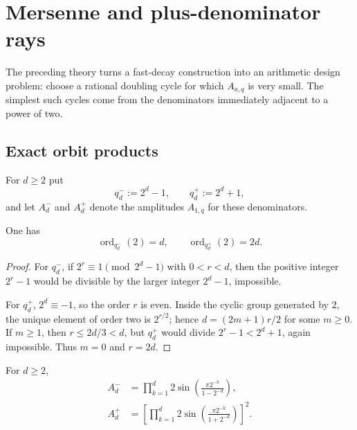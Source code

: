 \documentclass[11pt,oneside]{article}
\theoremstyle{definition}
\theoremstyle{remark}
\newcommand{\ord}{\operatorname{ord}}
\begin{document}
\section{Mersenne and plus-denominator rays}\label{p2:sec:mersenne}

The preceding theory turns a fast-decay construction into an arithmetic design
problem: choose a rational doubling cycle for which $A_{a,q}$ is very small. The
simplest such cycles come from the denominators immediately adjacent to a power of
two.

\subsection{Exact orbit products}

For $d\ge2$ put
\begin{equation}
 q_d^-:=2^d-1,
 \qquad q_d^+:=2^d+1,
 \label{p2:eq:qpm}
\end{equation}
and let $A_d^-$ and $A_d^+$ denote the amplitudes $A_{1,q}$ for these denominators.

\begin{lemma}\label{p2:lem:orders-pm}
One has
\begin{equation}
 \ord_{q_d^-}(2)=d,
 \qquad
 \ord_{q_d^+}(2)=2d.
 \label{p2:eq:orders-pm}
\end{equation}
\end{lemma}

\begin{proof}
For $q_d^-$, if $2^r\equiv1\pmod{2^d-1}$ with $0<r<d$, then the positive integer
$2^r-1$ would be divisible by the larger integer $2^d-1$, impossible.

For $q_d^+$, $2^d\equiv-1$, so the order $r$ is even. Inside the cyclic group
generated by $2$, the unique element of order two is $2^{r/2}$; hence
$d=(2m+1)r/2$ for some $m\ge0$. If $m\ge1$, then $r\le2d/3<d$, but
$q_d^+$ would divide $2^r-1<2^d+1$, again impossible. Thus $m=0$ and $r=2d$.
\end{proof}

\begin{proposition}\label{p2:prop:pm-products}
For $d\ge2$,
\begin{align}
 A_d^-&=\prod_{k=1}^{d}
 2\sin\!\left(\frac{\pi2^{-k}}{1-2^{-d}}\right),
 \label{p2:eq:Aminus-product}\\
 A_d^+&=\left[
 \prod_{k=1}^{d}
 2\sin\!\left(\frac{\pi2^{-k}}{1+2^{-d}}\right)
 \right]^2.
 \label{p2:eq:Aplus-product}
\end{align}
\end{proposition}
\end{document}
